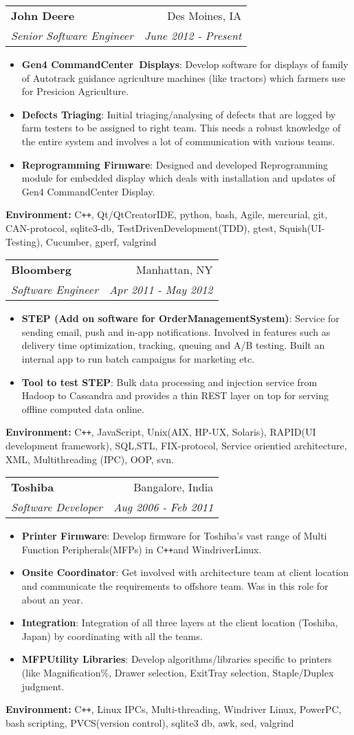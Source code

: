 \documentclass[letterpaper,11pt]{article}
\makeatletter
\newcommand{\resumeItem}[2]{
  \item\small{
    \textbf{#1}{: #2 \vspace{-2pt}}
  }
}
\newcommand{\resumeSubheading}[4]{
  \vspace{-1pt}\item
    \begin{tabular*}{0.97\textwidth}[t]{l@{\extracolsep{\fill}}r}
      \textbf{#1} & #2 \\
      \textit{\small#3} & \textit{\small #4} \\
    \end{tabular*}\vspace{-5pt}
}
\newcommand{\resumeItemListStart}{\begin{itemize}}
\newcommand{\resumeItemListEnd}{\end{itemize}\vspace{-5pt}}
\newcommand{\resumeSubHeadingEnvironment}[1]{\textbf{Environment:}{ #1}}
\newcommand{\cplusplus}{C\texttt{++}}
\makeatother
\begin{document}
    \resumeSubheading
      {John Deere}{Des Moines, IA}
      {Senior Software Engineer}{June 2012 - Present}
      \resumeItemListStart
        \resumeItem{Gen4 CommandCenter\texttrademark\ Displays}
          {Develop software for displays of family of Autotrack guidance agriculture machines (like tractors) which farmers use for Presicion Agriculture.}
        \resumeItem{Defects Triaging}
          {Initial triaging/analysing of defects that are logged by farm testers to be assigned to right team. This needs a robust knowledge of the entire system and involves a lot of communication with various teams.}
        \resumeItem{Reprogramming Firmware}
          {Designed and developed Reprogramming module for embedded display which deals with installation and updates of Gen4 CommandCenter Display.}
      \resumeItemListEnd
      \resumeSubHeadingEnvironment{\cplusplus, Qt/QtCreatorIDE, python, bash, Agile, mercurial, git, CAN-protocol, sqlite3-db, TestDrivenDevelopment(TDD), gtest, Squish(UI-Testing), Cucumber, gperf, valgrind}

    \resumeSubheading
      {Bloomberg}{Manhattan, NY}
      {Software Engineer}{Apr 2011 - May 2012}
      \resumeItemListStart
        \resumeItem{STEP (Add on software for OrderManagementSystem)}
          {Service for sending email, push and in-app notifications. Involved in features such as delivery time optimization, tracking, queuing and A/B testing. Built an internal app to run batch campaigns for marketing etc.}
        \resumeItem{Tool to test STEP}
          {Bulk data processing and injection service from Hadoop to Cassandra and provides a thin REST layer on top for serving offline computed data online.}
      \resumeItemListEnd
      \resumeSubHeadingEnvironment{\cplusplus, JavaScript, Unix(AIX,  HP-UX,  Solaris), RAPID(UI development framework), SQL,STL, FIX-protocol, Service orientied architecture, XML, Multithreading (IPC), OOP, svn.}


    \resumeSubheading
      {Toshiba}{Bangalore, India}
      {Software Developer}{Aug 2006 - Feb 2011}
      \resumeItemListStart
        \resumeItem{Printer Firmware}
          {Develop firmware for Toshiba's vast range of Multi Function Peripherals(MFPs) in \cplusplus and WindriverLinux.}
        \resumeItem{Onsite Coordinator}
          {Get involved with architecture team at client location and communicate the requirements to offshore team. Was in this role for about an year.}
        \resumeItem{Integration}
          {Integration of all three layers at the client location (Toshiba, Japan) by coordinating with all the teams.}
        \resumeItem{MFPUtility Libraries}
          {Develop algorithms/libraries specific to printers (like Magnification\%, Drawer selection, ExitTray selection, Staple/Duplex judgment.}
      \resumeItemListEnd
      \resumeSubHeadingEnvironment{\cplusplus, Linux  IPCs,  Multi-threading, Windriver  Linux,  PowerPC,  bash  scripting,  PVCS(version control), sqlite3 db, awk, sed, valgrind}
\end{document}
